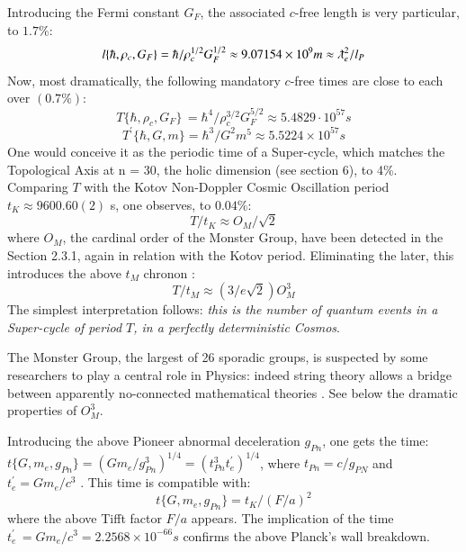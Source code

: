 \documentclass[twoside,draft]{article}
\begin{document}
\begin{sloppypar}
Introducing the Fermi constant $G_{F}$, the associated $c$-free length is very particular, to $1.7\%$:
$$l\{\hbar,\rho_{c},G_{F}\} = \hbar/\rho_{c}^{1/2} G_{F}^{1/2} \approx 9.07154 \times 10^{9} m \approx \lambdabar_{e}^{2}/l_{P}$$
Now, most dramatically, the following mandatory $c$-free times are close to each over $(0.7\%)$:
\begin{equation}
T\{\hbar,\rho_{c} ,G_{F} \}\, = \hbar^{4} /\rho_{c}^{3/2} G_{F}^{5/2} \approx 5.4829 \cdot 10^{57} s
\end{equation}
\begin{equation}
T^{\prime}\{\hbar,G,m\} = \hbar^{3} /G^{2} m^{5} \approx 5.5224 \times 10^{57} s
\end{equation}
One would conceive it as the periodic time of a Super-cycle, which matches the Topological Axis at n = 30,
the holic dimension (see section 6), to 4\%. Comparing $T$ with the Kotov Non-Doppler Cosmic
Oscillation period $t_{K} \approx 9600.60(2)$ s, one observes, to $0.04\%$:
$$T/t_{K} \approx O_{M} /\sqrt{2}$$
where $O_{M}$, the cardinal order of the Monster Group, have been detected in the Section 2.3.1, again in relation with the Kotov period. Eliminating the later, this introduces the above $t_M$ chronon :
\begin{equation}
T/t_M \approx (3/e\sqrt{2})O_M^3
\end{equation}
The simplest interpretation follows: \textit{this is the number of quantum events in a Super-cycle of period $T$, in a perfectly deterministic Cosmos}. 

The  Monster  Group,  the largest of 26 sporadic groups, is suspected by some researchers to play a central role in Physics: indeed string theory allows a bridge between apparently no-connected mathematical theories \cite{Borcherds}. See below the dramatic properties of $O_M^3$.

Introducing the above Pioneer abnormal deceleration $g_{Pn}$, one gets the time: 
$
t\{G, m_{e} , g_{Pn} \} = (Gm_{e} /g_{Pn}^{3} )^{1/4} = (t_{Pn}^{3} t^{\prime}_{e} )^{1/4}
$, where $t_{Pn} = c/g_{PN}$ and $t^{\prime}_{e} = Gm_{e} /c^{3}$ . This time is compatible with:
\begin{equation}
t\{G, m_{e} , g_{Pn} \} = t_{K} /(F/a)^{2}
\end{equation}
where the above Tifft factor $F/a$ appears. The implication of the time 
$t^{\prime}_{e}\, = Gm_{e} /c^{3} = 2.2568 \times 10^{-66} s$
confirms the above Planck's wall breakdown.


\end{sloppypar}
\end{document}
